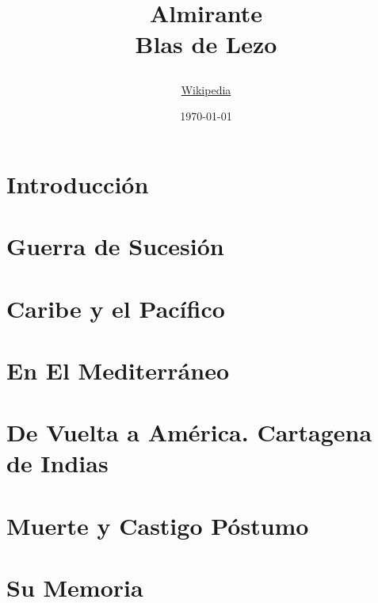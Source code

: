 \documentclass[10pt,
               spanish, %
               twocolumn,
               openright
               ]{report}
\title
{
\HRule
\begin{flushright}
\Large
\textbf{Almirante }\\[4mm]
\huge
\textbf{Blas de Lezo}\\
\end{flushright}
\HRule 
}
\author{\href{https://es.wikipedia.org/wiki/Blas_de_Lezo}{Wikipedia}}
\date{\today}
\begin{document}

\maketitle
\tableofcontents
\listoffigures

\chapter{Introducción}

\chapter{Guerra de Sucesión}

\chapter{Caribe y el Pacífico}

\chapter{En El Mediterráneo}

\chapter{De Vuelta a América. Cartagena de Indias}

\chapter{Muerte y Castigo Póstumo}

\chapter{Su Memoria}


\nocite{alo,arc,ber,fer,mar,qui,rod,smo}



\printindex
\end{document}
